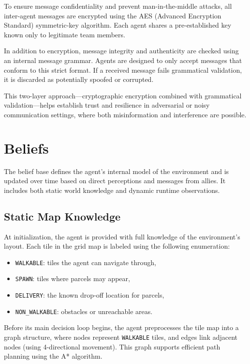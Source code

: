 \documentclass[conference]{IEEEtran}
\begin{document}
To ensure message confidentiality and prevent man-in-the-middle attacks, all inter-agent messages are encrypted using the AES (Advanced Encryption Standard) symmetric-key algorithm. Each agent shares a pre-established key known only to legitimate team members.

In addition to encryption, message integrity and authenticity are checked using an internal message grammar. Agents are designed to only accept messages that conform to this strict format. If a received message fails grammatical validation, it is discarded as potentially spoofed or corrupted.

This two-layer approach—cryptographic encryption combined with grammatical validation—helps establish trust and resilience in adversarial or noisy communication settings, where both misinformation and interference are possible.

\section{Beliefs}

The belief base defines the agent’s internal model of the environment and is updated over time based on direct perceptions and messages from allies. It includes both static world knowledge and dynamic runtime observations.

\subsection{Static Map Knowledge}

At initialization, the agent is provided with full knowledge of the environment's layout. Each tile in the grid map is labeled using the following enumeration:

\begin{itemize}
	\item \texttt{WALKABLE}: tiles the agent can navigate through,
	\item \texttt{SPAWN}: tiles where parcels may appear,
	\item \texttt{DELIVERY}: the known drop-off location for parcels,
	\item \texttt{NON\_WALKABLE}: obstacles or unreachable areas.
\end{itemize}

Before its main decision loop begins, the agent preprocesses the tile map into a graph structure, where nodes represent \texttt{WALKABLE} tiles, and edges link adjacent nodes (using 4-directional movement). This graph supports efficient path planning using the A* algorithm. 
\end{document}
